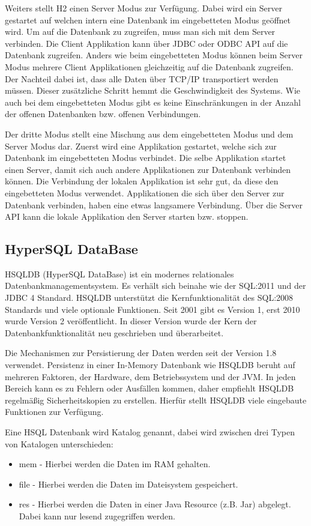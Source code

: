 \documentclass[draft,final]{vutinfth} %
\begin{document}
Weiters stellt H2 einen Server Modus zur Verfügung. Dabei wird ein Server gestartet auf welchen intern eine Datenbank im eingebetteten Modus geöffnet wird. Um auf die Datenbank zu zugreifen, muss man sich mit dem Server verbinden. Die Client Applikation kann über JDBC oder ODBC API auf die Datenbank zugreifen. Anders wie beim eingebetteten Modus können beim Server Modus mehrere Client Applikationen gleichzeitig auf die Datenbank zugreifen.
Der Nachteil dabei ist, dass alle Daten über TCP/IP transportiert werden müssen. Dieser zusätzliche Schritt hemmt die Geschwindigkeit des Systems. Wie auch bei dem eingebetteten Modus gibt es keine Einschränkungen in der Anzahl der offenen Datenbanken bzw. offenen Verbindungen.

Der dritte Modus stellt eine Mischung aus dem eingebetteten Modus und dem Server Modus dar. Zuerst wird eine Applikation gestartet, welche sich zur Datenbank im eingebetteten Modus verbindet. Die selbe Applikation startet einen Server, damit sich auch andere Applikationen zur Datenbank verbinden können. Die Verbindung der lokalen Applikation ist sehr gut, da diese den eingebetteten Modus verwendet. Applikationen die sich über den Server zur Datenbank verbinden, haben eine etwas langsamere Verbindung. Über die Server API kann die lokale Applikation den Server starten bzw. stoppen.

\cite{H2Adv}

\subsection{HyperSQL DataBase}
HSQLDB (HyperSQL DataBase) ist ein modernes relationales Datenbankmanagementsystem. Es verhält sich beinahe wie der SQL:2011 und der JDBC 4 Standard. HSQLDB unterstützt die Kernfunktionalität des SQL:2008 Standards und viele optionale Funktionen. Seit 2001 gibt es Version 1, erst 2010 wurde Version 2 veröffentlicht. In dieser Version wurde der Kern der Datenbankfunktionalität neu geschrieben und überarbeitet.

Die Mechanismen zur Persistierung der Daten werden seit der Version 1.8 verwendet. Persistenz in einer In-Memory Datenbank wie HSQLDB beruht auf mehreren Faktoren, der Hardware, dem Betriebssystem und der JVM. In jeden Bereich kann es zu Fehlern oder Ausfällen kommen, daher empfiehlt HSQLDB regelmä\ss ig Sicherheitskopien zu erstellen. Hierfür stellt HSQLDB viele eingebaute Funktionen zur Verfügung.

Eine HSQL Datenbank wird Katalog genannt, dabei wird zwischen drei Typen von Katalogen unterschieden:
\begin{itemize}
	\item mem - Hierbei werden die Daten im RAM gehalten.
	\item file - Hierbei werden die Daten im Dateisystem gespeichert.
	\item res - Hierbei werden die Daten in einer Java Resource (z.B. Jar) abgelegt. Dabei kann nur lesend zugegriffen werden.
\end{itemize}
\end{document}
